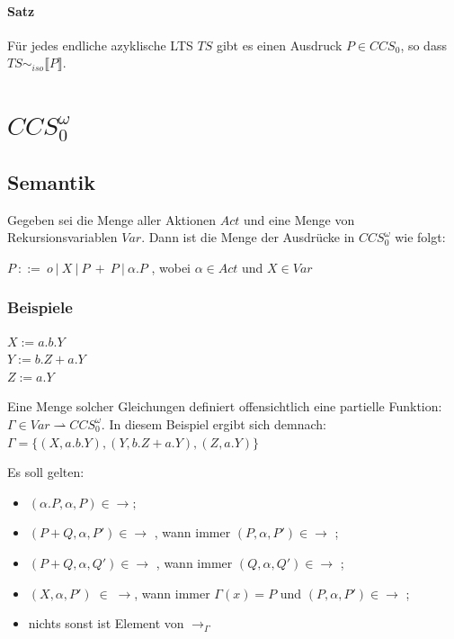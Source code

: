 \documentclass[a4paper,10pt, oneside]{book}
\begin{document}
\paragraph{Satz}
Für jedes endliche azyklische LTS $TS$ gibt es einen Ausdruck $P \in CCS_0$, so dass $TS \sim_{iso} \llbracket P \rrbracket$.

\section{$CCS_0^{\omega}$}
\subsection{Semantik}
Gegeben sei die Menge aller Aktionen $Act$ und eine Menge von Rekursionsvariablen $Var$. Dann ist die Menge der Ausdrücke in $CCS_0^{\omega}$ wie folgt:\\
\begin{center}
$ P \: ::= \: o \: | \: X \: | \: P \: + \: P \: | \: \alpha.P $ , wobei $\alpha \in Act$ und $X \in Var$ 
\end{center}

\subsubsection{Beispiele}
$ X := a.b.Y $\\
$ Y := b.Z + a.Y $\\
$ Z := a.Y $
\begin{flushleft}
Eine Menge solcher Gleichungen definiert offensichtlich eine partielle Funktion: $\Gamma \in Var \rightharpoonup CCS_0^{\omega}$. In diesem Beispiel ergibt sich demnach: $\Gamma = \{(X,a.b.Y),(Y,b.Z + a.Y),(Z,a.Y)\}$

\bigbreak

Es soll gelten:
\begin{itemize}
 \item $(\alpha.P,\alpha,P) \in \rightarrow ;$
 \item $ (P + Q, \alpha, P') \in \rightarrow$ , wann immer $(P,\alpha,P') \in \rightarrow$ ;
 \item $ (P + Q,\alpha, Q') \in \rightarrow$ , wann immer $(Q,\alpha,Q') \in \rightarrow$ ;
 \item $(X,\alpha,P') \; \in \; \rightarrow$, wann immer $\Gamma(x) = P$ und $ (P, \alpha, P') \in \rightarrow$ ;
 \item nichts sonst ist Element von $\rightarrow_{\Gamma}$
\end{itemize}
 
\end{flushleft}
\end{document}
